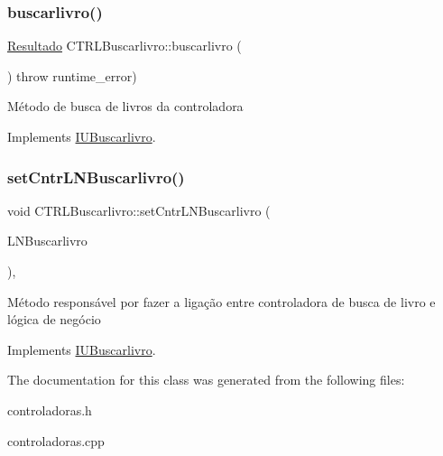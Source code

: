 \subsubsection{\texorpdfstring{buscarlivro()}{buscarlivro()}}
{\footnotesize\ttfamily \hyperlink{classResultado}{Resultado} C\+T\+R\+L\+Buscarlivro\+::buscarlivro (\begin{DoxyParamCaption}{ }\end{DoxyParamCaption}) throw  runtime\+\_\+error) \hspace{0.3cm}{\ttfamily [virtual]}}

Método de busca de livros da controladora 

Implements \hyperlink{classIUBuscarlivro}{I\+U\+Buscarlivro}.

\mbox{\label{classCTRLBuscarlivro_ae0022d7cf6df4d7f66a209929e7d8f53}} 
\subsubsection{\texorpdfstring{set\+Cntr\+L\+N\+Buscarlivro()}{setCntrLNBuscarlivro()}}
{\footnotesize\ttfamily void C\+T\+R\+L\+Buscarlivro\+::set\+Cntr\+L\+N\+Buscarlivro (\begin{DoxyParamCaption}\item[{\hyperlink{classILNBuscarlivro}{I\+L\+N\+Buscarlivro} $\ast$}]{L\+N\+Buscarlivro }\end{DoxyParamCaption})\hspace{0.3cm}{\ttfamily [inline]}, {\ttfamily [virtual]}}

Método responsável por fazer a ligação entre controladora de busca de livro e lógica de negócio 

Implements \hyperlink{classIUBuscarlivro}{I\+U\+Buscarlivro}.



The documentation for this class was generated from the following files\+:\begin{DoxyCompactItemize}
\item 
controladoras.\+h\item 
controladoras.\+cpp\end{DoxyCompactItemize}
